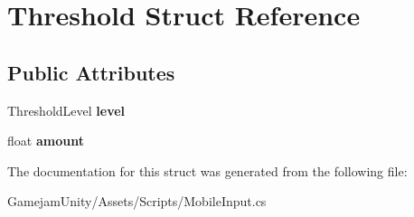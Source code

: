 \hypertarget{struct_threshold}{}\section{Threshold Struct Reference}
\label{struct_threshold}
\subsection*{Public Attributes}
\begin{DoxyCompactItemize}
\item 
\mbox{\label{struct_threshold_a50400d3879b9a6bd7f3efa417b16a26e}} 
Threshold\+Level {\bfseries level}
\item 
\mbox{\label{struct_threshold_aa48c4a9c221f68bab66c6d3862a262c0}} 
float {\bfseries amount}
\end{DoxyCompactItemize}


The documentation for this struct was generated from the following file\+:\begin{DoxyCompactItemize}
\item 
Gamejam\+Unity/\+Assets/\+Scripts/Mobile\+Input.\+cs\end{DoxyCompactItemize}

